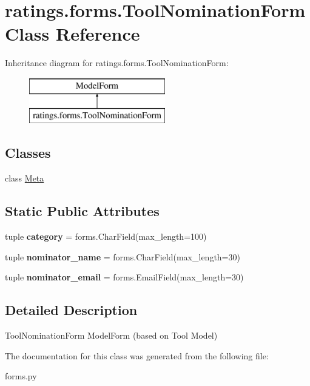 \hypertarget{classratings_1_1forms_1_1ToolNominationForm}{\section{ratings.\-forms.\-Tool\-Nomination\-Form Class Reference}
\label{classratings_1_1forms_1_1ToolNominationForm}
}
Inheritance diagram for ratings.\-forms.\-Tool\-Nomination\-Form\-:\begin{figure}[H]
\begin{center}
\leavevmode
\includegraphics[height=2.000000cm]{classratings_1_1forms_1_1ToolNominationForm}
\end{center}
\end{figure}
\subsection*{Classes}
\begin{DoxyCompactItemize}
\item 
class \hyperlink{classratings_1_1forms_1_1ToolNominationForm_1_1Meta}{Meta}
\end{DoxyCompactItemize}
\subsection*{Static Public Attributes}
\begin{DoxyCompactItemize}
\item 
\hypertarget{classratings_1_1forms_1_1ToolNominationForm_aa7d72b9ca22d5bb212b8a4fd6675e8c5}{tuple {\bfseries category} = forms.\-Char\-Field(max\-\_\-length=100)}\label{classratings_1_1forms_1_1ToolNominationForm_aa7d72b9ca22d5bb212b8a4fd6675e8c5}

\item 
\hypertarget{classratings_1_1forms_1_1ToolNominationForm_a47bba4737e0facbf3fb26009d1169964}{tuple {\bfseries nominator\-\_\-name} = forms.\-Char\-Field(max\-\_\-length=30)}\label{classratings_1_1forms_1_1ToolNominationForm_a47bba4737e0facbf3fb26009d1169964}

\item 
\hypertarget{classratings_1_1forms_1_1ToolNominationForm_a274a9b153d8ac39909d8f8a837ba4994}{tuple {\bfseries nominator\-\_\-email} = forms.\-Email\-Field(max\-\_\-length=30)}\label{classratings_1_1forms_1_1ToolNominationForm_a274a9b153d8ac39909d8f8a837ba4994}

\end{DoxyCompactItemize}


\subsection{Detailed Description}
\begin{DoxyVerb}ToolNominationForm ModelForm (based on Tool Model)
\end{DoxyVerb}
 

The documentation for this class was generated from the following file\-:\begin{DoxyCompactItemize}
\item 
forms.\-py\end{DoxyCompactItemize}

